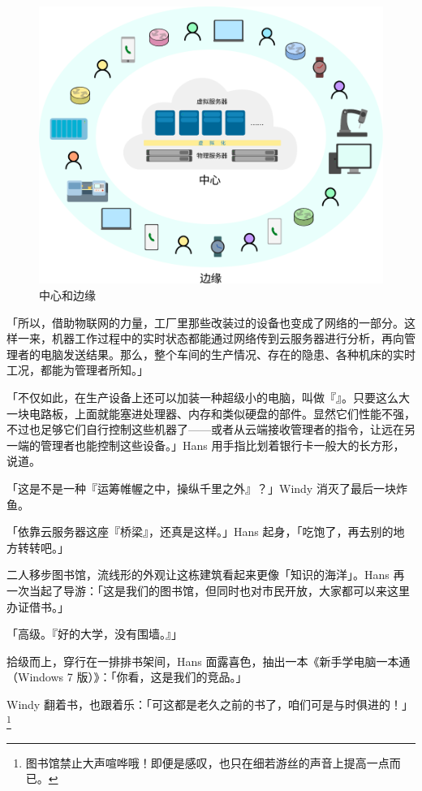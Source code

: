 \begin{figure}[htb!]
  \centering
  \includegraphics[width=.8\textwidth]{assets/surpass/Centre_and_edge.pdf}
  \caption{中心和边缘}
  \label{fig:Centre_and_edge}
\end{figure}

「所以，借助物联网的力量，工厂里那些改装过的设备也变成了网络的一部分。这样一来，机器工作过程中的实时状态都能通过网络传到云服务器进行分析，再向管理者的电脑发送结果。那么，整个车间的生产情况、存在的隐患、各种机床的实时工况，都能为管理者所知。」

「不仅如此，在生产设备上还可以加装一种超级小的电脑，叫做『』。只要这么大一块电路板，上面就能塞进处理器、内存和类似硬盘的部件。显然它们性能不强，不过也足够它们自行控制这些机器了——或者从云端接收管理者的指令，让远在另一端的管理者也能控制这些设备。」Hans 用手指比划着银行卡一般大的长方形，说道。

「这是不是一种『运筹帷幄之中，操纵千里之外』？」Windy 消灭了最后一块炸鱼。

「依靠云服务器这座『桥梁』，还真是这样。」Hans 起身，「吃饱了，再去别的地方转转吧。」

二人移步图书馆，流线形的外观让这栋建筑看起来更像「知识的海洋」。Hans 再一次当起了导游：「这是我们的图书馆，但同时也对市民开放，大家都可以来这里办证借书。」

「高级。『好的大学，没有围墙。』」

拾级而上，穿行在一排排书架间，Hans 面露喜色，抽出一本《新手学电脑一本通（Windows 7 版）》：「你看，这是我们的竞品。」

Windy 翻着书，也跟着乐：「可这都是老久之前的书了，咱们可是与时俱进的！」\footnote{图书馆禁止大声喧哗哦！即便是感叹，也只在细若游丝的声音上提高一点而已。}

